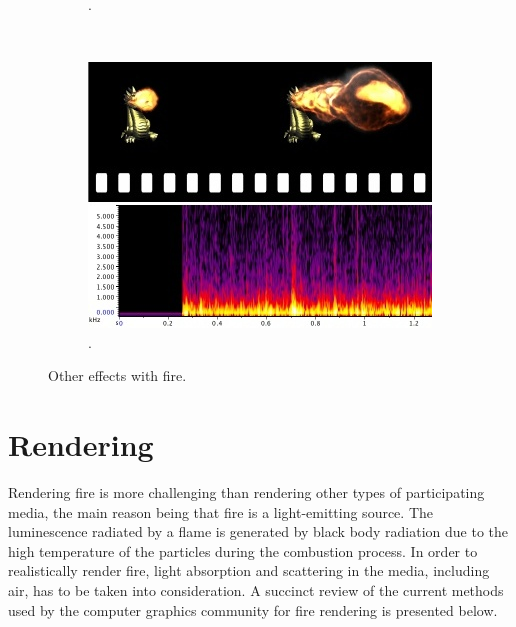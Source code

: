 \begin{figure}[htpb!]
\begin{subfigure}[t]{0.4\textwidth}
                \caption{\cite{Melek:2005}.}
        \end{subfigure}  
        ~ %
        \begin{subfigure}[t]{0.3\textwidth}
                \includegraphics[width=\textwidth]{img/chadwick_2011}
                \caption{\cite{Chadwick:2011}.}
        \end{subfigure}          
        \caption{Other effects with fire.}
        \label{fig:other_effects}
\end{figure}



\section{Rendering}
\label{sec:rendering}

Rendering fire is more challenging than rendering other types of participating media, the main reason being that fire is a light-emitting source.
The luminescence radiated by a flame is generated by black body radiation due to the high temperature of the particles during the combustion process.
In order to realistically render fire, light absorption and scattering in the media, including air, has to be taken into consideration.
A succinct review of the current methods used by the computer graphics community for fire rendering is presented below.

